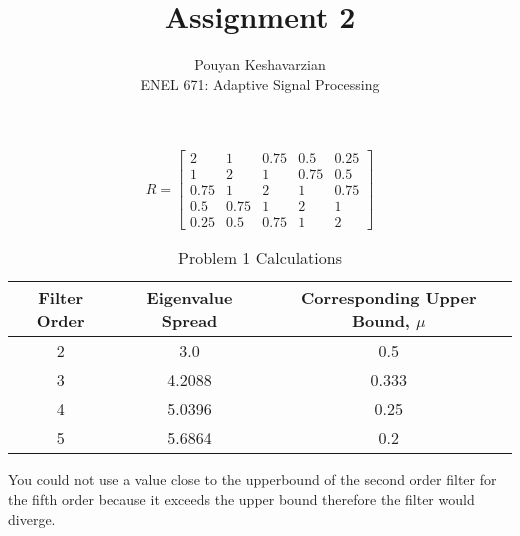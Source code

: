 \documentclass[12pt]{article}
\newenvironment{problem}[2][Problem]{\begin{trivlist}
\item[\hskip \labelsep {\bfseries #1}\hskip \labelsep {\bfseries #2.}]}{\end{trivlist}}
\begin{document}
\title{Assignment 2}
\author{Pouyan Keshavarzian\\
ENEL 671: Adaptive Signal Processing}
\maketitle

\begin{problem}{1}
\[
  R=
    \begin{bmatrix}
      2 & 1 & 0.75 & 0.5 & 0.25 \\
      1 & 2 & 1 & 0.75 & 0.5 \\
      0.75 & 1 & 2 & 1 & 0.75 \\
      0.5 & 0.75 & 1 & 2 & 1 \\
      0.25 & 0.5 & 0.75 & 1 & 2
    \end{bmatrix}
\]
\begin{table}[H]
\centering
 \begin{tabular}{ | c | c | c |}
    \hline
    Filter Order & Eigenvalue Spread & Corresponding Upper Bound, $\mu$\\
    \hline\hline
    2        & 3.0 & 0.5 \\
    \hline
    3        & 4.2088 & 0.333 \\
    \hline
    4        & 5.0396 & 0.25\\
    \hline
    5        & 5.6864 & 0.2\\
    \hline
  \end{tabular}
  \caption{Problem 1 Calculations}
  \label{table:calcs}
\end{table}
You could not use a value close to the upperbound of the second order
filter for the fifth order because it exceeds the upper bound
therefore the filter would diverge.\\
\end{problem}
\end{document}
